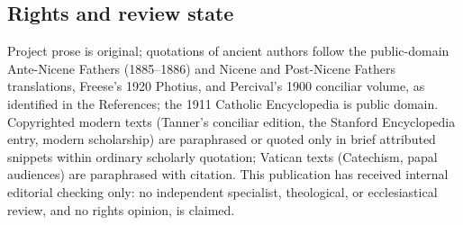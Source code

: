 \subsection{Rights and review state}

Project prose is original; quotations of ancient authors follow the
public-domain Ante-Nicene Fathers (1885--1886) and Nicene and Post-Nicene
Fathers translations, Freese's 1920 Photius, and Percival's 1900 conciliar
volume, as identified in the References; the 1911 Catholic Encyclopedia is
public domain. Copyrighted modern texts (Tanner's conciliar edition, the
Stanford Encyclopedia entry, modern scholarship) are paraphrased or quoted
only in brief attributed snippets within ordinary scholarly quotation;
Vatican texts (Catechism, papal audiences) are paraphrased with citation.
This publication has received internal editorial checking only: no
independent specialist, theological, or ecclesiastical review, and no
rights opinion, is claimed.
